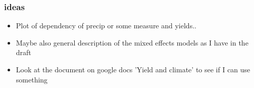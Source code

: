 \documentclass{beamer}              %
\begin{document}





\begin{frame}

\frametitle{ideas}

\begin{itemize}
\color{red}
\item Plot of dependency of precip or some measure and yields..
\item Maybe also general description of the mixed effects models as I have in the draft
\item Look at the document on google docs 'Yield and climate' to see if I can use something
\end{itemize}
\color{black}
\end{frame}

\end{document}
